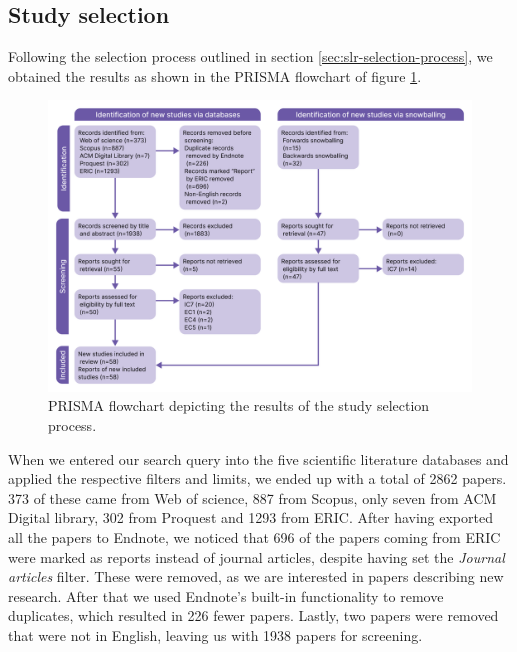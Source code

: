 \subsection{Study selection}
Following the selection process outlined in section \ref{sec:slr-selection-process}, we obtained the results as shown in the PRISMA flowchart of figure \ref{fig:prisma-flowchart}.

\begin{figure}[h!]
    \centering
    \includegraphics[width=\textwidth]{figures/PRISMA diagram.png}
    \caption{PRISMA flowchart depicting the results of the study selection process.}
    \label{fig:prisma-flowchart}
\end{figure}

When we entered our search query into the five scientific literature databases and applied the respective filters and limits, we ended up with a total of 2862 papers. 373 of these came from Web of science, 887 from Scopus, only seven from ACM Digital library, 302 from Proquest and 1293 from ERIC. After having exported all the papers to Endnote, we noticed that 696 of the papers coming from ERIC were marked as reports instead of journal articles, despite having set the \textit{Journal articles} filter. These were removed, as we are interested in papers describing new research. After that we used Endnote's built-in functionality to remove duplicates, which resulted in 226 fewer papers. Lastly, two papers were removed that were not in English, leaving us with 1938 papers for screening.

